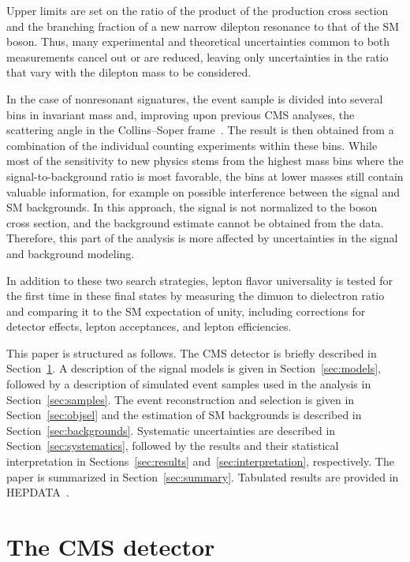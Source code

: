 \documentclass[11pt,twoside,a4paper,cmspaper,final,collab]{cms-tdr}
\begin{document}
Upper limits are set on the ratio of the product of the production cross section and the branching fraction of a new narrow dilepton resonance to that of the SM \PZ boson. 
Thus, many experimental and theoretical uncertainties common to both measurements cancel out or are reduced, leaving only uncertainties in the ratio that vary with the dilepton mass to be considered.  

In the case of nonresonant signatures,  the event sample is divided into several bins in invariant mass and, improving upon previous CMS analyses, the scattering angle \costheta in the Collins--Soper frame~\cite{Collins:1977iv}. The result is then obtained from a combination of the individual counting experiments within these bins. While most of the sensitivity to new physics stems from the highest mass bins where the signal-to-background ratio is most favorable, the bins at lower masses still contain valuable information, for example on possible interference between the signal and SM backgrounds. In this approach, the signal is not normalized to the \PZ boson cross section, and the background estimate cannot be obtained from the data. Therefore, this part of the analysis is more affected by uncertainties in the signal and background modeling. 

In addition to these two search strategies, lepton flavor universality is tested for the first time in these final states by measuring the dimuon to dielectron ratio \Rmumuee and comparing it to the SM expectation of unity, including corrections for detector effects, lepton acceptances, and lepton efficiencies.

This paper is structured as follows. The CMS detector is briefly described in Section~\ref{sec:detector}. A description of the signal models is given in Section~\ref{sec:models}, followed by a description of simulated event samples used in the analysis in Section~\ref{sec:samples}. The event reconstruction and selection is given in Section~\ref{sec:objsel} and the estimation of SM backgrounds is described in Section~\ref{sec:backgrounds}. Systematic uncertainties are described in Section~\ref{sec:systematics}, followed by the results and their statistical interpretation in Sections~\ref{sec:results} and~\ref{sec:interpretation}, respectively. The paper is summarized in Section~\ref{sec:summary}. Tabulated results are provided in HEPDATA~\cite{hepdata}.

\section{The CMS detector}
\label{sec:detector}
\end{document}
